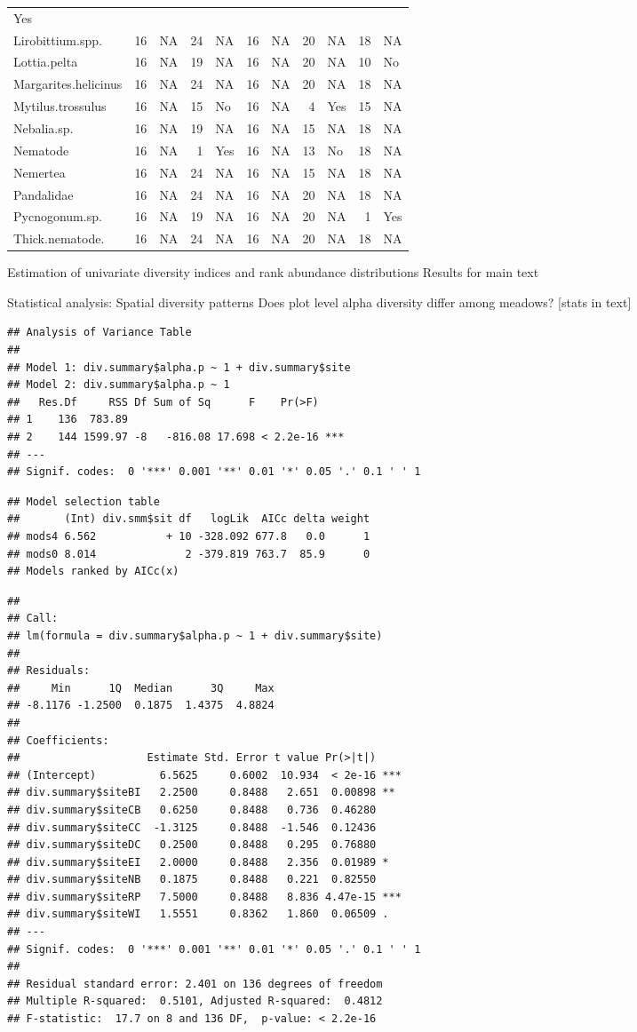 \documentclass[]{article}
\begin{document}
\begin{longtable}[]{@{}lrlrlrlrlrl@{}}
Yes\tabularnewline
Lirobittium.spp. & 16 & NA & 24 & NA & 16 & NA & 20 & NA & 18 &
NA\tabularnewline
Lottia.pelta & 16 & NA & 19 & NA & 16 & NA & 20 & NA & 10 &
No\tabularnewline
Margarites.helicinus & 16 & NA & 24 & NA & 16 & NA & 20 & NA & 18 &
NA\tabularnewline
Mytilus.trossulus & 16 & NA & 15 & No & 16 & NA & 4 & Yes & 15 &
NA\tabularnewline
Nebalia.sp. & 16 & NA & 19 & NA & 16 & NA & 15 & NA & 18 &
NA\tabularnewline
Nematode & 16 & NA & 1 & Yes & 16 & NA & 13 & No & 18 &
NA\tabularnewline
Nemertea & 16 & NA & 24 & NA & 16 & NA & 15 & NA & 18 &
NA\tabularnewline
Pandalidae & 16 & NA & 24 & NA & 16 & NA & 20 & NA & 18 &
NA\tabularnewline
Pycnogonum.sp. & 16 & NA & 19 & NA & 16 & NA & 20 & NA & 1 &
Yes\tabularnewline
Thick.nematode. & 16 & NA & 24 & NA & 16 & NA & 20 & NA & 18 &
NA\tabularnewline
\bottomrule
\end{longtable}

Estimation of univariate diversity indices and rank abundance
distributions Results for main text

Statistical analysis: Spatial diversity patterns Does plot level alpha
diversity differ among meadows? {[}stats in text{]}

\begin{verbatim}
## Analysis of Variance Table
## 
## Model 1: div.summary$alpha.p ~ 1 + div.summary$site
## Model 2: div.summary$alpha.p ~ 1
##   Res.Df     RSS Df Sum of Sq      F    Pr(>F)    
## 1    136  783.89                                  
## 2    144 1599.97 -8   -816.08 17.698 < 2.2e-16 ***
## ---
## Signif. codes:  0 '***' 0.001 '**' 0.01 '*' 0.05 '.' 0.1 ' ' 1
\end{verbatim}

\begin{verbatim}
## Model selection table 
##       (Int) div.smm$sit df   logLik  AICc delta weight
## mods4 6.562           + 10 -328.092 677.8   0.0      1
## mods0 8.014              2 -379.819 763.7  85.9      0
## Models ranked by AICc(x)
\end{verbatim}

\begin{verbatim}
## 
## Call:
## lm(formula = div.summary$alpha.p ~ 1 + div.summary$site)
## 
## Residuals:
##     Min      1Q  Median      3Q     Max 
## -8.1176 -1.2500  0.1875  1.4375  4.8824 
## 
## Coefficients:
##                    Estimate Std. Error t value Pr(>|t|)    
## (Intercept)          6.5625     0.6002  10.934  < 2e-16 ***
## div.summary$siteBI   2.2500     0.8488   2.651  0.00898 ** 
## div.summary$siteCB   0.6250     0.8488   0.736  0.46280    
## div.summary$siteCC  -1.3125     0.8488  -1.546  0.12436    
## div.summary$siteDC   0.2500     0.8488   0.295  0.76880    
## div.summary$siteEI   2.0000     0.8488   2.356  0.01989 *  
## div.summary$siteNB   0.1875     0.8488   0.221  0.82550    
## div.summary$siteRP   7.5000     0.8488   8.836 4.47e-15 ***
## div.summary$siteWI   1.5551     0.8362   1.860  0.06509 .  
## ---
## Signif. codes:  0 '***' 0.001 '**' 0.01 '*' 0.05 '.' 0.1 ' ' 1
## 
## Residual standard error: 2.401 on 136 degrees of freedom
## Multiple R-squared:  0.5101, Adjusted R-squared:  0.4812 
## F-statistic:  17.7 on 8 and 136 DF,  p-value: < 2.2e-16
\end{verbatim}
\end{document}
